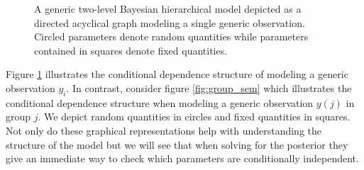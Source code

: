\begin{figure}[!ht]
\begin{center}
\end{center}
\label{fig:general_sem}
\caption{A generic two-level Bayesian hierarchical model depicted as a directed acyclical graph modeling a single generic observation. Circled parameters denote random quantities while parameters contained in squares denote fixed quantities.}
\end{figure}


Figure \ref{fig:general_sem} illustrates the conditional dependence structure of modeling a generic observation $y_i$.
In contrast, consider figure \ref{fig:group_sem} which illustrates the conditional dependence structure when modeling a generic observation $y(j)$ in group $j$.
We depict random quantities in circles and fixed quantities in squares.
Not only do these graphical representations help with understanding the structure of the model but we will see that when solving for the posterior they give an immediate way to check which parameters are conditionally independent.

